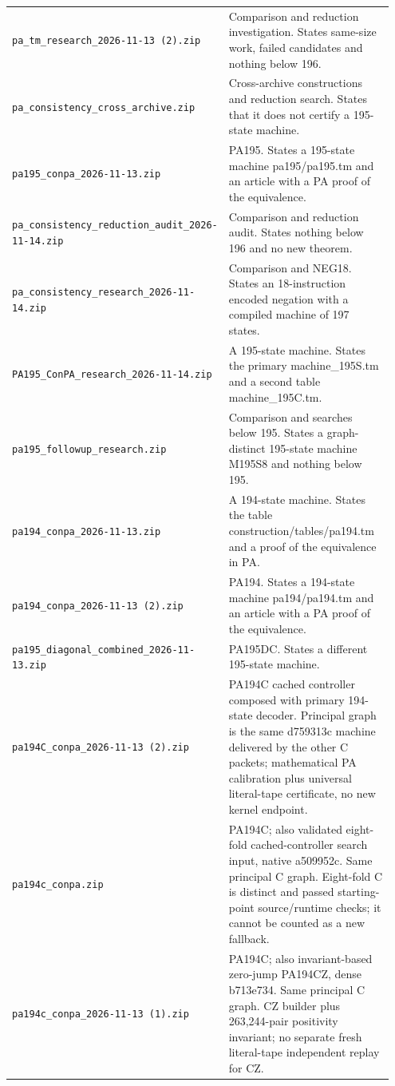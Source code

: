 \begin{longtable}{@{}p{0.34\linewidth}p{0.61\linewidth}@{}}
\nolinkurl{pa_tm_research_2026-11-13 (2).zip} & Comparison and reduction investigation. States same-size work, failed candidates and nothing below 196. \\[5pt]
\nolinkurl{pa_consistency_cross_archive.zip} & Cross-archive constructions and reduction search. States that it does not certify a 195-state machine. \\[5pt]
\nolinkurl{pa195_conpa_2026-11-13.zip} & PA195. States a 195-state machine pa195/pa195.tm and an article with a PA proof of the equivalence. \\[5pt]
\nolinkurl{pa_consistency_reduction_audit_2026-11-14.zip} & Comparison and reduction audit. States nothing below 196 and no new theorem. \\[5pt]
\nolinkurl{pa_consistency_research_2026-11-14.zip} & Comparison and NEG18. States an 18-instruction encoded negation with a compiled machine of 197 states. \\[5pt]
\nolinkurl{PA195_ConPA_research_2026-11-14.zip} & A 195-state machine. States the primary machine\_195S.tm and a second table machine\_195C.tm. \\[5pt]
\nolinkurl{pa195_followup_research.zip} & Comparison and searches below 195. States a graph-distinct 195-state machine M195S8 and nothing below 195. \\[5pt]
\nolinkurl{pa194_conpa_2026-11-13.zip} & A 194-state machine. States the table construction/tables/pa194.tm and a proof of the equivalence in PA. \\[5pt]
\nolinkurl{pa194_conpa_2026-11-13 (2).zip} & PA194. States a 194-state machine pa194/pa194.tm and an article with a PA proof of the equivalence. \\[5pt]
\nolinkurl{pa195_diagonal_combined_2026-11-13.zip} & PA195DC. States a different 195-state machine. \\[5pt]
\nolinkurl{pa194C_conpa_2026-11-13 (2).zip} & PA194C cached controller composed with primary 194-state decoder. Principal graph is the same d759313c machine delivered by the other C packets; mathematical PA calibration plus universal literal-tape certificate, no new kernel endpoint. \\[5pt]
\nolinkurl{pa194c_conpa.zip} & PA194C; also validated eight-fold cached-controller search input, native a509952c. Same principal C graph. Eight-fold C is distinct and passed starting-point source/runtime checks; it cannot be counted as a new fallback. \\[5pt]
\nolinkurl{pa194c_conpa_2026-11-13 (1).zip} & PA194C; also invariant-based zero-jump PA194CZ, dense b713e734. Same principal C graph. CZ builder plus 263,244-pair positivity invariant; no separate fresh literal-tape independent replay for CZ. \\[5pt]

\end{longtable}
